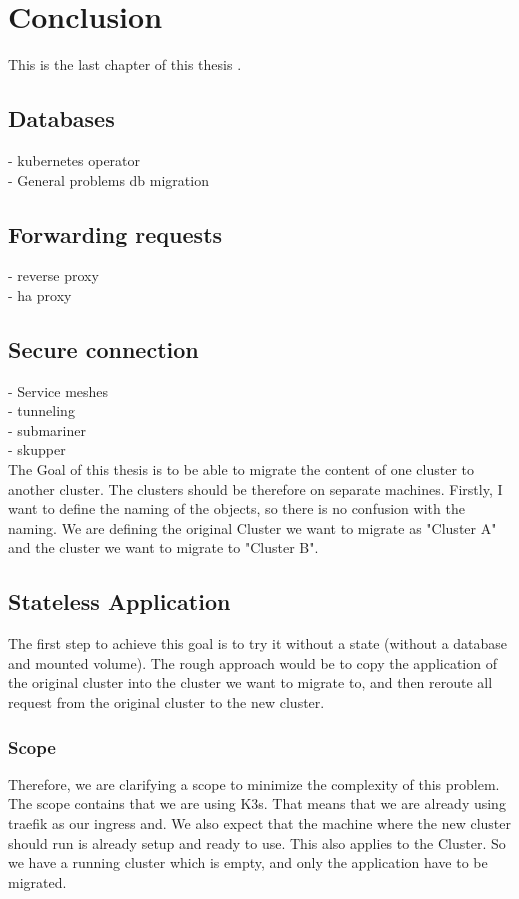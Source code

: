 %
\section{Conclusion}\label{sec:conclusion}%
This is the last chapter of this thesis \cite{tur38}.
%
\subsection{Databases}
- kubernetes operator\\
- General problems db migration\\

\subsection{Forwarding requests}
- reverse proxy\\
- ha proxy\\
\subsection{Secure connection}
- Service meshes\\
- tunneling\\
- submariner\\
- skupper \\

The Goal of this thesis is to be able to migrate the content of one cluster to another cluster. The clusters should be therefore on separate machines. Firstly, I want to define the naming of the objects, so there is no confusion with the naming. We are defining the original Cluster we want to migrate as "Cluster A" and the cluster we want to migrate to "Cluster B".
%
\subsection{Stateless Application}
The first step to achieve this goal is to try it without a state (without a database and mounted volume). The rough approach would be to copy the application of the original cluster into the cluster we want to migrate to, and then reroute all request from the original cluster to the new cluster.
%
\subsubsection{Scope}
Therefore, we are clarifying a scope to minimize the complexity of this problem. The scope contains that we are using K3s. That means that we are already using traefik as our ingress and.
We also expect that the machine where the new cluster should run is already setup and ready to use. This also applies to the Cluster. So we have a running cluster which is empty, and only the application have to be migrated.
%
